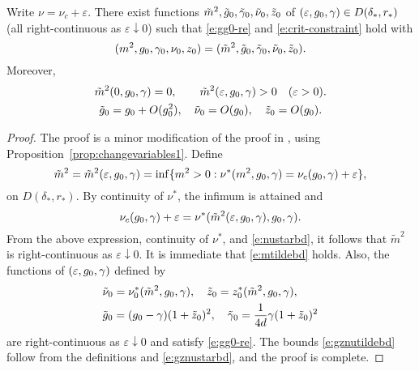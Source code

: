 \begin{prop}
\label{prop:changevariables2}
Write $\nu = \nu_c + \varepsilon$.
There exist functions $\tilde m^2, \tilde {g}_0, \tilde\gamma_0, \tilde\nu_0, \tilde z_0$
of $(\varepsilon, g_0, \gamma) \in D(\delta_*, r_*)$
(all right-continuous as $\varepsilon\downarrow 0$)
such that \eqref{e:gg0-re} and \eqref{e:crit-constraint} hold with
\begin{equation}
(m^2, g_0, \gamma_0, \nu_0, z_0) = (\tilde m^2, \tilde {g}_0, \tilde\gamma_0, \tilde\nu_0, \tilde z_0).
\end{equation}
Moreover,
\begin{gather}
\label{e:mtildebd}
\tilde m^2(0, g_0, \gamma) = 0,
		\qquad
\tilde m^2(\varepsilon, g_0, \gamma) > 0
		\quad
(\varepsilon > 0). \\
\label{e:gznutildebd}
\tilde {g}_0 = g_0 + O(g_0^2),
		\quad
\tilde \nu_0 = O(g_0),
		\quad
\tilde z_0 = O(g_0).
\end{gather}
\end{prop}

\begin{proof}
The proof is a minor modification of the proof in \cite{BBS-saw4-log},
using Proposition~\ref{prop:changevariables1}.
Define
\begin{equation}
\label{e:mtildef}
\tilde m^2
		=
\tilde m^2 (\varepsilon,g_0,\gamma)
		=
\inf \{m^2 > 0 : \nu^*(m^2, g_0, \gamma) = \nu_c(g_0, \gamma) + \varepsilon \},
\end{equation}
on $D(\delta_*, r_*)$.
By continuity of $\nu^*$,
the infimum is attained and
\begin{equation}
\nu_c(g_0, \gamma) + \varepsilon = \nu^*(\tilde m^2(\varepsilon, g_0, \gamma), g_0, \gamma).
\end{equation}
From the above expression, continuity of $\nu^*$, and \eqref{e:nustarbd},
it follows that $\tilde m^2$ is right-continuous as $\varepsilon\downarrow 0$.
It is immediate that \eqref{e:mtildebd} holds.
Also, the functions of $(\varepsilon,g_0,\gamma)$ defined by
\begin{align}
&\tilde\nu_0 = \nu_0^*(\tilde m^2, g_0, \gamma), \quad
\tilde z_0 = z_0^*(\tilde m^2, g_0, \gamma), \\
&\tilde {g}_0 = (g_0 - \gamma) (1 + \tilde z_0)^2 ,\quad
\tilde\gamma_0 = \frac{1}{4d} \gamma (1 + \tilde z_0)^2
\end{align}
are right-continuous as $\varepsilon \downarrow 0$ and satisfy \eqref{e:gg0-re}.
The bounds \eqref{e:gznutildebd} follow from the definitions
and \eqref{e:gznustarbd}, and the proof is complete.
\end{proof}

